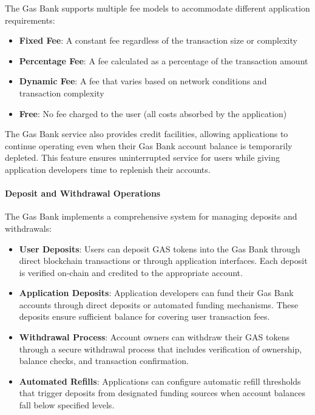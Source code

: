 The Gas Bank supports multiple fee models to accommodate different application requirements:

\begin{itemize}
    \item \textbf{Fixed Fee}: A constant fee regardless of the transaction size or complexity
    \item \textbf{Percentage Fee}: A fee calculated as a percentage of the transaction amount
    \item \textbf{Dynamic Fee}: A fee that varies based on network conditions and transaction complexity
    \item \textbf{Free}: No fee charged to the user (all costs absorbed by the application)
\end{itemize}

The Gas Bank service also provides credit facilities, allowing applications to continue operating even when their Gas Bank account balance is temporarily depleted. This feature ensures uninterrupted service for users while giving application developers time to replenish their accounts.



\paragraph{Deposit and Withdrawal Operations}
The Gas Bank implements a comprehensive system for managing deposits and withdrawals:

\begin{itemize}
    \item \textbf{User Deposits}: Users can deposit GAS tokens into the Gas Bank through direct blockchain transactions or through application interfaces. Each deposit is verified on-chain and credited to the appropriate account.
    
    \item \textbf{Application Deposits}: Application developers can fund their Gas Bank accounts through direct deposits or automated funding mechanisms. These deposits ensure sufficient balance for covering user transaction fees.
    
    \item \textbf{Withdrawal Process}: Account owners can withdraw their GAS tokens through a secure withdrawal process that includes verification of ownership, balance checks, and transaction confirmation.
    
    \item \textbf{Automated Refills}: Applications can configure automatic refill thresholds that trigger deposits from designated funding sources when account balances fall below specified levels.
\end{itemize}

